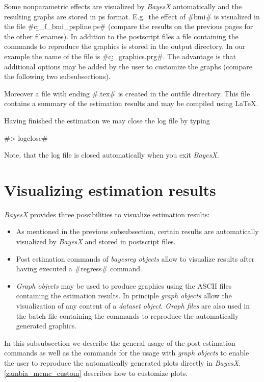 \documentclass[11pt,a4paper,twoside]{bayesxreport}
\begin{document}
Some nonparametric effects are visualized by {\em BayesX}
automatically and the resulting graphs are stored in ps format.
E.g.~the effect of #bmi# is visualized in the file
#c:\data\b_f_bmi_pspline.ps# (compare the results on the previous
pages for the other filenames). In addition to the postscript files
a file containing the commands to reproduce the graphics is stored
in the output directory. In our example the name of the file is
#c:\data\b_graphics.prg#. The advantage is that additional options
may be added by the user to customize the graphs (compare the
following two subsubsections).

Moreover a file with ending #.tex# is created in the outfile
directory. This file contains a summary of the estimation results
and may be compiled using \LaTeX.

Having finished the estimation we may close the log file by typing

#> logclose#

Note, that the log file is closed automatically when you exit {\em
BayesX}.

\section{Visualizing estimation results}\label{zambia_mcmc_visual}

{\em BayesX} provides three possibilities to visualize estimation
results:
\begin{itemize}
\item As mentioned in the previous subsubsection, certain results
are automatically visualized by {\em BayesX} and stored in
postscript files. \item Post estimation commands of {\em bayesreg
objects} allow to visualize results after having executed a
#regress# command. \item {\em Graph objects} may be used to produce
graphics using the ASCII files containing the estimation results. In
principle {\em graph objects} allow the visualization of any content
of a {\em dataset object}. {\em Graph files} are also used in the
batch file containing the commands to reproduce the automatically
generated graphics.
\end{itemize}

In this subsubsection we describe the general usage of the post
estimation commands as well as the commands for the usage with {\em
graph objects} to enable the user to reproduce the automatically
generated plots directly in {\em BayesX}.
\autoref{zambia_mcmc_custom} describes how to customize plots.
\end{document}
